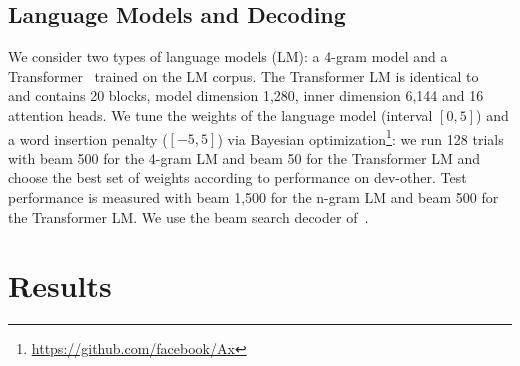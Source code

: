 \documentclass{article}
\begin{document}
\subsection{Language Models and Decoding}

We consider two types of language models (LM): a 4-gram model and a Transformer~\citep{baevski2018adaptive} trained on the \libri{} LM corpus.
The Transformer LM is identical to~\citep{synnaeve2020end} and contains 20 blocks, model dimension 1,280, inner dimension 6,144 and 16 attention heads. 
We tune the weights of the language model (interval $[0,5]$) and a word insertion penalty ($[-5,5]$) via Bayesian optimization\footnote{\url{https://github.com/facebook/Ax}}: 
we run 128 trials with beam 500 for the 4-gram LM and beam 50 for the Transformer LM and choose the best set of weights according to performance on dev-other.
Test performance is measured with beam 1,500 for the n-gram LM and beam 500 for the Transformer LM.
We use the beam search decoder of~\cite{pratap2019w2l}.

\section{Results}
\label{sec:results}
\end{document}
